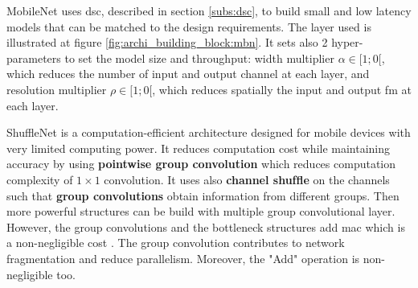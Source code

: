 MobileNet \cite{howard_mobilenets_2017} uses \acrshort{dsc}, described in section \ref{subs:dsc}, to build small and low latency models that can be matched to the design requirements. The layer used is illustrated at figure \ref{fig:archi_building_block:mbn}. It sets also 2 hyper-parameters to set the model size and throughput: width multiplier $\alpha \in [1; 0[$, which reduces the number of input and output channel at each layer, and resolution multiplier $\rho \in [1; 0[$,  which reduces spatially the input and output \acrshort{fm} at each layer.

ShuffleNet \cite{zhang_shufflenet_2018} is a computation-efficient architecture designed for mobile devices with very limited computing power. It reduces computation cost while maintaining accuracy by using \textbf{pointwise group convolution} which reduces computation complexity of $1 \times 1$ convolution. It uses also \textbf{channel shufﬂe} on the channels such that \textbf{group convolutions} obtain information from different groups. Then more powerful structures can be build with multiple group convolutional layer. However, the group convolutions and the bottleneck structures add \acrshort{mac} which is a non-negligible cost \cite{ma_shufflenet_2018}. The group convolution contributes to network fragmentation and reduce parallelism. Moreover, the "Add" operation is non-negligible too.

